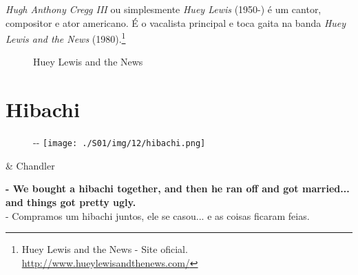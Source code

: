 \emph{Hugh Anthony Cregg III} ou simplesmente \emph{Huey Lewis} (1950-)
é um cantor, compositor e ator americano. É o vacalista principal e toca
gaita na banda \emph{Huey Lewis and the News} (1980).\footnote{\sloppy Huey Lewis and the News - Site oficial. \url{http://www.hueylewisandthenews.com/}}

\begin{figure}
  \centering
    \caption{Huey Lewis and the News\label{fig:huey-lewis-and-the-news}}
\end{figure}

\hypertarget{hibachi}{%
\section{Hibachi}\label{hibachi}}

\begin{figure}[!ht]
  \begin{adjustwidth}{-\oddsidemargin-1in}{-\rightmargin}
    \centering
    \texttt{[image: ./S01/img/12/hibachi.png]}
  \end{adjustwidth}
\end{figure}

\begin{tcolorbox}[enhanced,center upper,
    drop fuzzy shadow southeast, boxrule=0.3pt,
    lower separated=false, breakable,
    colframe=black!30!dialogoBorder,colback=white]
\begin{minipage}[c]{0.16\linewidth}
   & \centering \scriptsize{Chandler}
\end{minipage}
\hfill
\begin{minipage}[c]{0.8\linewidth}
  \textbf{- We bought a hibachi together, and then he ran off and got married... and things got pretty ugly.}\\
  - Compramos um hibachi juntos, ele se casou...  e as coisas ficaram feias.
\end{minipage}
\end{tcolorbox}

